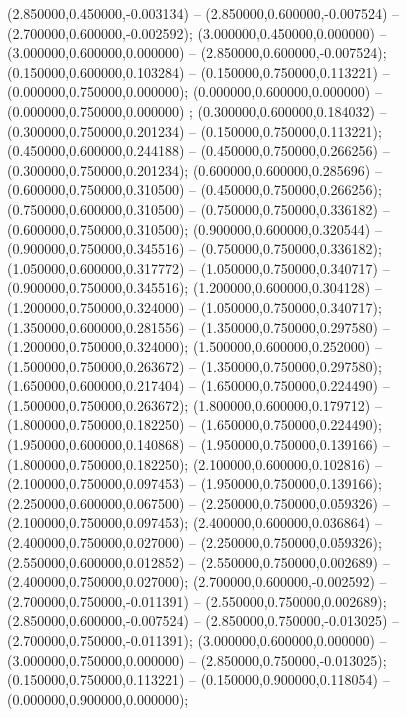  (2.850000,0.450000,-0.003134) -- (2.850000,0.600000,-0.007524) -- (2.700000,0.600000,-0.002592);
 (3.000000,0.450000,0.000000) -- (3.000000,0.600000,0.000000) -- (2.850000,0.600000,-0.007524);
 (0.150000,0.600000,0.103284) -- (0.150000,0.750000,0.113221) -- (0.000000,0.750000,0.000000);
 (0.000000,0.600000,0.000000) -- (0.000000,0.750000,0.000000) ;
 (0.300000,0.600000,0.184032) -- (0.300000,0.750000,0.201234) -- (0.150000,0.750000,0.113221);
 (0.450000,0.600000,0.244188) -- (0.450000,0.750000,0.266256) -- (0.300000,0.750000,0.201234);
 (0.600000,0.600000,0.285696) -- (0.600000,0.750000,0.310500) -- (0.450000,0.750000,0.266256);
 (0.750000,0.600000,0.310500) -- (0.750000,0.750000,0.336182) -- (0.600000,0.750000,0.310500);
 (0.900000,0.600000,0.320544) -- (0.900000,0.750000,0.345516) -- (0.750000,0.750000,0.336182);
 (1.050000,0.600000,0.317772) -- (1.050000,0.750000,0.340717) -- (0.900000,0.750000,0.345516);
 (1.200000,0.600000,0.304128) -- (1.200000,0.750000,0.324000) -- (1.050000,0.750000,0.340717);
 (1.350000,0.600000,0.281556) -- (1.350000,0.750000,0.297580) -- (1.200000,0.750000,0.324000);
 (1.500000,0.600000,0.252000) -- (1.500000,0.750000,0.263672) -- (1.350000,0.750000,0.297580);
 (1.650000,0.600000,0.217404) -- (1.650000,0.750000,0.224490) -- (1.500000,0.750000,0.263672);
 (1.800000,0.600000,0.179712) -- (1.800000,0.750000,0.182250) -- (1.650000,0.750000,0.224490);
 (1.950000,0.600000,0.140868) -- (1.950000,0.750000,0.139166) -- (1.800000,0.750000,0.182250);
 (2.100000,0.600000,0.102816) -- (2.100000,0.750000,0.097453) -- (1.950000,0.750000,0.139166);
 (2.250000,0.600000,0.067500) -- (2.250000,0.750000,0.059326) -- (2.100000,0.750000,0.097453);
 (2.400000,0.600000,0.036864) -- (2.400000,0.750000,0.027000) -- (2.250000,0.750000,0.059326);
 (2.550000,0.600000,0.012852) -- (2.550000,0.750000,0.002689) -- (2.400000,0.750000,0.027000);
 (2.700000,0.600000,-0.002592) -- (2.700000,0.750000,-0.011391) -- (2.550000,0.750000,0.002689);
 (2.850000,0.600000,-0.007524) -- (2.850000,0.750000,-0.013025) -- (2.700000,0.750000,-0.011391);
 (3.000000,0.600000,0.000000) -- (3.000000,0.750000,0.000000) -- (2.850000,0.750000,-0.013025);
 (0.150000,0.750000,0.113221) -- (0.150000,0.900000,0.118054) -- (0.000000,0.900000,0.000000);
